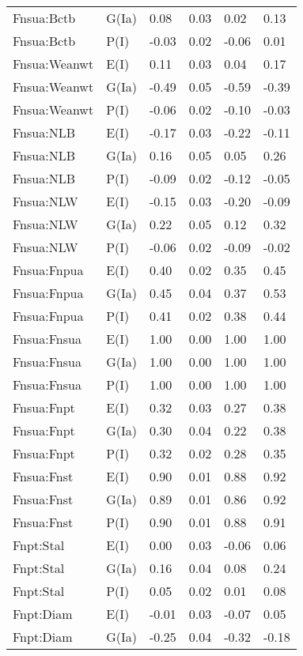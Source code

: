 \begin{center}
\begin{longtable}{|p{1.1in}|p{0.7in}|p{0.7in}|p{0.6in}|p{0.6in}|p{0.6in}|}
  Fnsua:Bctb & G(Ia) & 0.08 & 0.03 & 0.02 & 0.13 \\ 
  Fnsua:Bctb & P(I) & -0.03 & 0.02 & -0.06 & 0.01 \\ 
  Fnsua:Weanwt & E(I) & 0.11 & 0.03 & 0.04 & 0.17 \\ 
  Fnsua:Weanwt & G(Ia) & -0.49 & 0.05 & -0.59 & -0.39 \\ 
  Fnsua:Weanwt & P(I) & -0.06 & 0.02 & -0.10 & -0.03 \\ 
  Fnsua:NLB & E(I) & -0.17 & 0.03 & -0.22 & -0.11 \\ 
  Fnsua:NLB & G(Ia) & 0.16 & 0.05 & 0.05 & 0.26 \\ 
  Fnsua:NLB & P(I) & -0.09 & 0.02 & -0.12 & -0.05 \\ 
  Fnsua:NLW & E(I) & -0.15 & 0.03 & -0.20 & -0.09 \\ 
  Fnsua:NLW & G(Ia) & 0.22 & 0.05 & 0.12 & 0.32 \\ 
  Fnsua:NLW & P(I) & -0.06 & 0.02 & -0.09 & -0.02 \\ 
  Fnsua:Fnpua & E(I) & 0.40 & 0.02 & 0.35 & 0.45 \\ 
  Fnsua:Fnpua & G(Ia) & 0.45 & 0.04 & 0.37 & 0.53 \\ 
  Fnsua:Fnpua & P(I) & 0.41 & 0.02 & 0.38 & 0.44 \\ 
  Fnsua:Fnsua & E(I) & 1.00 & 0.00 & 1.00 & 1.00 \\ 
  Fnsua:Fnsua & G(Ia) & 1.00 & 0.00 & 1.00 & 1.00 \\ 
  Fnsua:Fnsua & P(I) & 1.00 & 0.00 & 1.00 & 1.00 \\ 
  Fnsua:Fnpt & E(I) & 0.32 & 0.03 & 0.27 & 0.38 \\ 
  Fnsua:Fnpt & G(Ia) & 0.30 & 0.04 & 0.22 & 0.38 \\ 
  Fnsua:Fnpt & P(I) & 0.32 & 0.02 & 0.28 & 0.35 \\ 
  Fnsua:Fnst & E(I) & 0.90 & 0.01 & 0.88 & 0.92 \\ 
  Fnsua:Fnst & G(Ia) & 0.89 & 0.01 & 0.86 & 0.92 \\ 
  Fnsua:Fnst & P(I) & 0.90 & 0.01 & 0.88 & 0.91 \\ 
  Fnpt:Stal & E(I) & 0.00 & 0.03 & -0.06 & 0.06 \\ 
  Fnpt:Stal & G(Ia) & 0.16 & 0.04 & 0.08 & 0.24 \\ 
  Fnpt:Stal & P(I) & 0.05 & 0.02 & 0.01 & 0.08 \\ 
  Fnpt:Diam & E(I) & -0.01 & 0.03 & -0.07 & 0.05 \\ 
  Fnpt:Diam & G(Ia) & -0.25 & 0.04 & -0.32 & -0.18 \\ 

\end{longtable}
\end{center}
